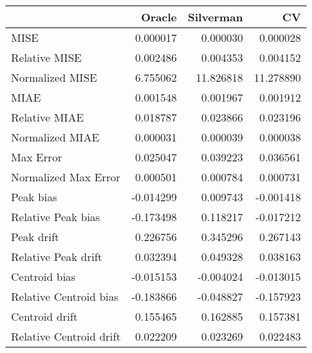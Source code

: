 \begin{tabular}{lrrr}
  \hline
 & Oracle & Silverman & CV \\ 
  \hline
MISE & 0.000017 & 0.000030 & 0.000028 \\ 
  Relative MISE & 0.002486 & 0.004353 & 0.004152 \\ 
  Normalized MISE & 6.755062 & 11.826818 & 11.278890 \\ 
  MIAE & 0.001548 & 0.001967 & 0.001912 \\ 
  Relative MIAE & 0.018787 & 0.023866 & 0.023196 \\ 
  Normalized MIAE & 0.000031 & 0.000039 & 0.000038 \\ 
  Max Error & 0.025047 & 0.039223 & 0.036561 \\ 
  Normalized Max Error & 0.000501 & 0.000784 & 0.000731 \\ 
  Peak bias & -0.014299 & 0.009743 & -0.001418 \\ 
  Relative Peak bias & -0.173498 & 0.118217 & -0.017212 \\ 
  Peak drift & 0.226756 & 0.345296 & 0.267143 \\ 
  Relative Peak drift & 0.032394 & 0.049328 & 0.038163 \\ 
  Centroid bias & -0.015153 & -0.004024 & -0.013015 \\ 
  Relative Centroid bias & -0.183866 & -0.048827 & -0.157923 \\ 
  Centroid drift & 0.155465 & 0.162885 & 0.157381 \\ 
  Relative Centroid drift & 0.022209 & 0.023269 & 0.022483 \\ 
   \hline
\end{tabular}
